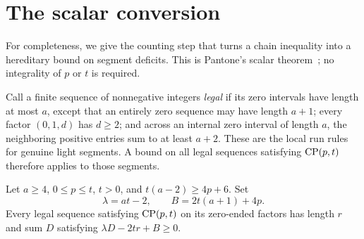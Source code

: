 \section{The scalar conversion}\label{app:scalar}

For completeness, we give the counting step that turns a chain
inequality into a hereditary bound on segment deficits. This is Pantone's scalar theorem~\cite{pantone-framework}; no
integrality of $p$ or $t$ is required.

Call a finite sequence of nonnegative integers \emph{legal} if its
zero intervals have length at most $a$, except that an entirely zero
sequence may have length $a+1$; every factor $(0,1,d)$ has $d\ge2$;
and across an internal zero interval of length $a$, the neighboring
positive entries sum to at least $a+2$. These are the local run rules
for genuine light segments. A bound on all legal sequences satisfying
$\operatorname{CP}(p,t)$ therefore applies to those segments.

\begin{lemma}\label{lem:scalar}
Let $a\ge4$, $0\le p\le t$, $t>0$, and $t(a-2)\ge4p+6$.
Set
\[
 \lambda=at-2,\qquad B=2t(a+1)+4p.
\]
Every legal sequence satisfying $\operatorname{CP}(p,t)$ on its zero-ended factors
has length $r$ and sum $D$ satisfying $\lambda D-2tr+B\ge0$.
\end{lemma}

